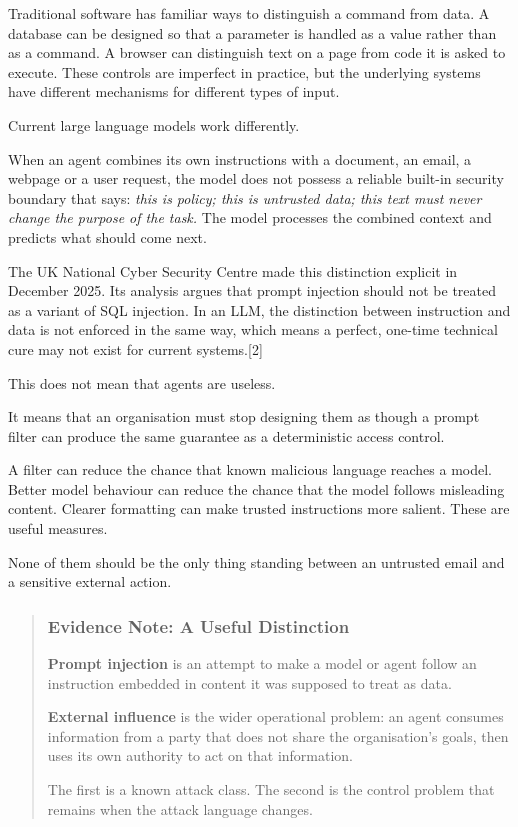 Traditional software has familiar ways to distinguish a command from
data. A database can be designed so that a parameter is handled as a
value rather than as a command. A browser can distinguish text on a page
from code it is asked to execute. These controls are imperfect in
practice, but the underlying systems have different mechanisms for
different types of input.

Current large language models work differently.

When an agent combines its own instructions with a document, an email, a
webpage or a user request, the model does not possess a reliable
built-in security boundary that says: \emph{this is policy; this is
untrusted data; this text must never change the purpose of the task.}
The model processes the combined context and predicts what should come
next.

The UK National Cyber Security Centre made this distinction explicit in
December 2025. Its analysis argues that prompt injection should not be
treated as a variant of SQL injection. In an LLM, the distinction
between instruction and data is not enforced in the same way, which
means a perfect, one-time technical cure may not exist for current
systems.{[}2{]}

This does not mean that agents are useless.

It means that an organisation must stop designing them as though a
prompt filter can produce the same guarantee as a deterministic access
control.

A filter can reduce the chance that known malicious language reaches a
model. Better model behaviour can reduce the chance that the model
follows misleading content. Clearer formatting can make trusted
instructions more salient. These are useful measures.

None of them should be the only thing standing between an untrusted
email and a sensitive external action.

\begin{quote}
\subsubsection{Evidence Note: A Useful
Distinction}\label{evidence-note-a-useful-distinction}

\textbf{Prompt injection} is an attempt to make a model or agent follow
an instruction embedded in content it was supposed to treat as data.

\textbf{External influence} is the wider operational problem: an agent
consumes information from a party that does not share the organisation's
goals, then uses its own authority to act on that information.

The first is a known attack class. The second is the control problem
that remains when the attack language changes.
\end{quote}

